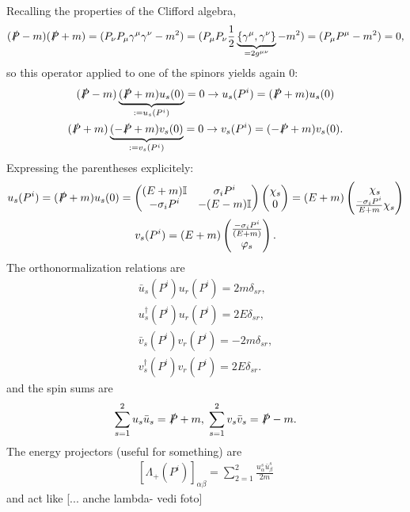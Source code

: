 Recalling the properties of the Clifford algebra,
$$(\slashed{P}-m)(\slashed{P}+m)=(P_\nu P_\mu\gamma^\mu\gamma^\nu - m^2) = 
(P_\mu P_\nu\frac{1}{2}\underbrace{\left\{\gamma^\mu,\gamma^\nu\right\}}_{
=2g^{\mu\nu}}-m^2)=(P_\mu P^\mu-m^2)=0,$$
so this operator applied to one of the spinors yields again $0$:
\begin{gather*}
(\slashed{P}-m)\underbrace{(\slashed{P}+m)u_s(0)}_{:=u_s(P^i)}=0\to
u_s(P^i)=(\slashed{P}+m)u_s(0)\\
(\slashed{P}+m)\underbrace{(-\slashed{P}+m)v_s(0)}_{:=v_s(P^i)}=0\to
v_s(P^i)=(-\slashed{P}+m)v_s(0).
\end{gather*}
Expressing the parentheses explicitely:
\begin{gather*}
u_s(P^i)=(\slashed{P}+m)u_s(0) = \begin{pmatrix}
    (E+m)\mathbb{I}&\sigma_i P^i\\
    -\sigma_iP^i& -(E-m)\mathbb{I}
\end{pmatrix}\begin{pmatrix}\chi_s\\0\end{pmatrix}=
(E+m)\begin{pmatrix}
\chi_s \\
\frac{-\sigma_iP^i}{E+m}\chi_s
\end{pmatrix}\\
    v_s(P^i) = (E+m)\begin{pmatrix}
    \frac{-\sigma_iP^i}{(E+m)}\\\varphi_s
    \end{pmatrix}. 
\end{gather*}
The orthonormalization relations are
\begin{gather*}
\bar u_s(P^i) u_r(P^i) = 2m\delta_{sr},\\
u^\dagger_s(P^i)u_r(P^i) = 2E\delta_{sr},\\
\bar v_s(P^i)v_r(P^i) = -2m\delta_{sr},\\
v^\dagger_s(P^i)v_r(P^i) = 2E\delta_{sr}.
\end{gather*}
and the spin sums are
\begin{gather*}
    \sum_{s=1}^{2}u_s\bar u_s =\slashed{P}+m,\;
    \sum_{s=1}^{2}v_s\bar v_s =\slashed{P}-m.
\end{gather*}
The energy projectors (useful for something) are
\begin{gather*}
    \left[\Lambda_+(P^i)\right]_{\alpha\beta} =
    \sum_{2=1}^{2} \frac{u^s_\alpha\bar u^s_\beta}{2m}
\end{gather*}
and act like [... anche lambda- vedi foto]

